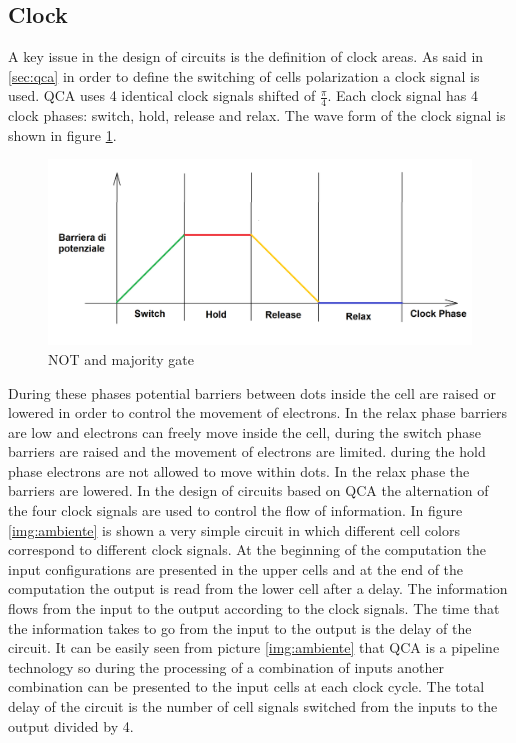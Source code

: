 \subsection{Clock}
\label{sec:clock}
A key issue in the design of circuits is the definition of clock areas. As said in \ref{sec:qca} in order to define the switching of cells polarization a clock signal is used. QCA uses 4 identical clock signals shifted of $\frac{\pi}{4}$. Each clock signal has 4 clock phases: switch, hold, release and relax. The wave form of the clock signal is shown in figure \ref{img:clock}. 

\begin{figure}
\centering
\includegraphics[scale=0.1]{img/clock.png}
\caption{NOT and majority gate}
\label{img:clock}
\end{figure}

During these phases potential barriers between dots inside the cell are raised or lowered in order to control the movement of electrons. In the relax phase barriers are low and electrons can freely move inside the cell, during the switch phase barriers are raised and the movement of electrons are limited. during the hold phase electrons are not allowed to move within dots. In the relax phase the barriers are lowered. \newline
In the design of circuits based on QCA the alternation of the four clock signals are used to control the flow of information. In figure \ref{img:ambiente} is shown a very simple circuit in which different cell colors correspond to different clock signals. At the beginning of the computation the input configurations are presented in the upper cells and at the end of the computation the output is read from the lower cell after a delay. The information flows from the input to the output according to the clock signals. The time that the information takes to go from the input to the output is the delay of the circuit. It can be easily seen from picture \ref{img:ambiente} that QCA is a pipeline technology so during the processing of a combination of inputs another combination can be presented to the input cells at each clock cycle. The total delay of the circuit is the number of cell signals switched from the inputs to the output divided by 4.

